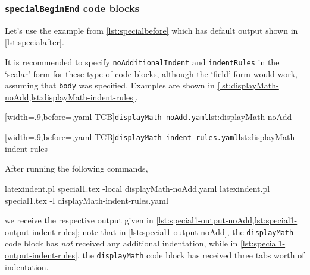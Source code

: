 \subsubsection{\texttt{specialBeginEnd} code blocks}
	Let's use the example from \vref{lst:specialbefore} which has default output shown in
	\vref{lst:specialafter}.

	It is recommended to specify \texttt{noAdditionalIndent} and \texttt{indentRules} in the `scalar' form 
	for these type of code blocks, although the `field' form would work, assuming that \texttt{body} was specified.
	Examples are shown in \cref{lst:displayMath-noAdd,lst:displayMath-indent-rules}.

	\begin{minipage}{.49\textwidth}
		[width=.9\linewidth,before=\centering,yaml-TCB]{\texttt{displayMath-noAdd.yaml}}{lst:displayMath-noAdd}
	\end{minipage}
	\hfill
	\begin{minipage}{.49\textwidth}
		[width=.9\linewidth,before=\centering,yaml-TCB]{\texttt{displayMath-indent-rules.yaml}}{lst:displayMath-indent-rules}
	\end{minipage}

	After running the following commands,
	\begin{commandshell}
latexindent.pl special1.tex -local displayMath-noAdd.yaml  
latexindent.pl special1.tex -l displayMath-indent-rules.yaml  
\end{commandshell}
	we receive the respective output given in \cref{lst:special1-output-noAdd,lst:special1-output-indent-rules}; note that
	in \cref{lst:special1-output-noAdd}, the \texttt{displayMath} code block has \emph{not} received any additional indentation,
	while in \cref{lst:special1-output-indent-rules}, the \texttt{displayMath} code block has received three tabs worth of indentation.

	\begin{minipage}{.45\textwidth}
	\end{minipage}
	\hfill
	\begin{minipage}{.45\textwidth}
	\end{minipage}

